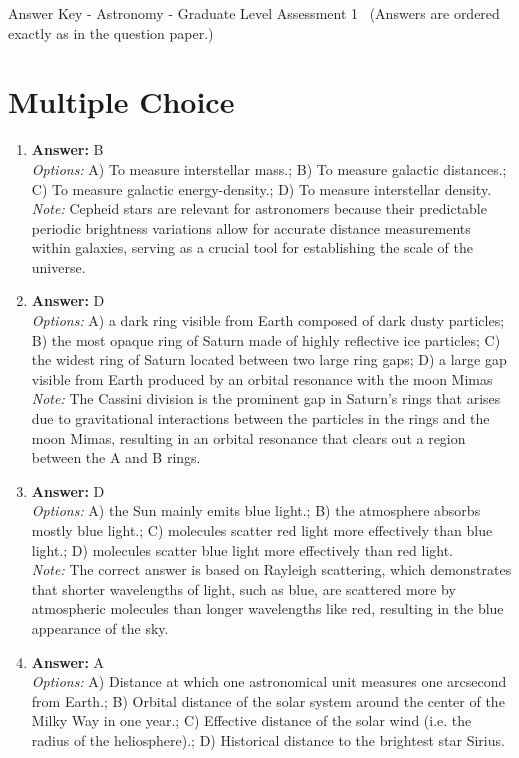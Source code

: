 \documentclass[12pt]{article}
\begin{document}
\begin{center}
Answer Key - Astronomy - Graduate Level Assessment 1 \
\small (Answers are ordered exactly as in the question paper.)
\end{center}

\section*{Multiple Choice}
\begin{enumerate}[label=\arabic*.]
\item \textbf{Answer:} B
\\ \textit{Options:} A) To measure interstellar mass.; B) To measure galactic distances.; C) To measure galactic energy-density.; D) To measure interstellar density.
\\ \textit{Note:} Cepheid stars are relevant for astronomers because their predictable periodic brightness variations allow for accurate distance measurements within galaxies, serving as a crucial tool for establishing the scale of the universe.
\item \textbf{Answer:} D
\\ \textit{Options:} A) a dark ring visible from Earth composed of dark dusty particles; B) the most opaque ring of Saturn made of highly reflective ice particles; C) the widest ring of Saturn located between two large ring gaps; D) a large gap visible from Earth produced by an orbital resonance with the moon Mimas
\\ \textit{Note:} The Cassini division is the prominent gap in Saturn's rings that arises due to gravitational interactions between the particles in the rings and the moon Mimas, resulting in an orbital resonance that clears out a region between the A and B rings.
\item \textbf{Answer:} D
\\ \textit{Options:} A) the Sun mainly emits blue light.; B) the atmosphere absorbs mostly blue light.; C) molecules scatter red light more effectively than blue light.; D) molecules scatter blue light more effectively than red light.
\\ \textit{Note:} The correct answer is based on Rayleigh scattering, which demonstrates that shorter wavelengths of light, such as blue, are scattered more by atmospheric molecules than longer wavelengths like red, resulting in the blue appearance of the sky.
\item \textbf{Answer:} A
\\ \textit{Options:} A) Distance at which one astronomical unit measures one arcsecond from Earth.; B) Orbital distance of the solar system around the center of the Milky Way in one year.; C) Effective distance of the solar wind (i.e. the radius of the heliosphere).; D) Historical distance to the brightest star Sirius.

\end{enumerate}
\end{document}
